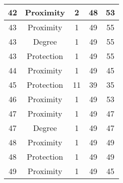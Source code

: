 \documentclass[results.tex]{subfiles}
\begin{document}
\begin{center}
\begin{tabular}{| c || c | c | c | c |}
    \hline
    42 & Proximity & 2 & 48 & 53 \\ 
    \hline
    43 & Proximity & 1 & 49 & 55 \\ 
    \hline
    43 & Degree & 1 & 49 & 55 \\ 
    \hline
    43 & Protection & 1 & 49 & 55 \\ 
    \hline
    44 & Proximity & 1 & 49 & 45 \\ 
    \hline
    45 & Protection & 11 & 39 & 35 \\ 
    \hline
    46 & Proximity & 1 & 49 & 53 \\ 
    \hline
    47 & Proximity & 1 & 49 & 47 \\ 
    \hline
    47 & Degree & 1 & 49 & 47 \\ 
    \hline
    48 & Proximity & 1 & 49 & 49 \\ 
    \hline
    48 & Protection & 1 & 49 & 49 \\ 
    \hline
    49 & Proximity & 1 & 49 & 45 \\ 
    \hline   \end{tabular}
\end{center}
\end{document}

